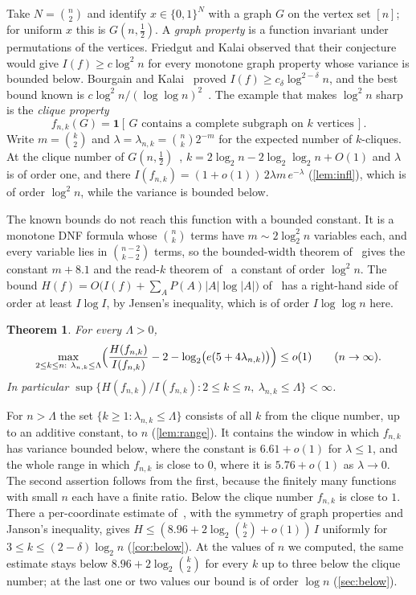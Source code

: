 \documentclass[11pt]{amsart}
\newtheorem{theorem}{Theorem}[section]
\theoremstyle{remark}
\newcommand{\bits}{\{0,1\}}
\begin{document}
Take $N=\binom n2$ and identify $x\in\bits^N$ with a graph $G$ on the vertex set $[n]$; for uniform $x$ this is
$G(n,\frac12)$. A \emph{graph property} is a function invariant under permutations of the vertices. Friedgut and
Kalai observed that their conjecture would give $I(f)\ge c\log^2n$ for every monotone graph property whose variance
is bounded below. Bourgain and Kalai~\cite{BK97} proved $I(f)\ge c_\delta\log^{2-\delta}n$, and the best bound known
is $c\log^2n/(\log\log n)^2$~\cite{KKLMS20}. The example that makes $\log^2n$ sharp is the \emph{clique property}
\[
f_{n,k}(G)=\mathbf 1[\,G\text{ contains a complete subgraph on $k$ vertices}\,].
\]
Write $m=\binom k2$ and $\lambda=\lambda_{n,k}=\binom nk2^{-m}$ for the expected number of $k$-cliques. At the clique
number of $G(n,\frac12)$~\cite{BE76,Mat76}, $k=2\log_2n-2\log_2\log_2n+O(1)$ and $\lambda$ is of order one, and
there $I(f_{n,k})=(1+o(1))\,2\lambda m\,e^{-\lambda}$ (\cref{lem:infl}), which is of order $\log^2n$, while the variance
is bounded below.

The known bounds do not reach this function with a bounded constant. It is a monotone DNF formula whose $\binom nk$
terms have $m\sim2\log_2^2n$ variables each, and every variable lies in $\binom{n-2}{k-2}$ terms, so the
bounded-width theorem of~\cite{Shm26b} gives the constant $m+8.1$ and the read-$k$ theorem of~\cite{Shm26a} a constant
of order $\log^2n$. The bound $H(f)=O\bigl(I(f)+\sum_AP(A)|A|\log|A|\bigr)$ of~\cite{KKLMS20} has a right-hand side
of order at least $I\log I$, by Jensen's inequality, which is of order $I\log\log n$ here.

\begin{theorem}\label{thm:main}
For every $\Lambda>0$,
\[
\max_{2\le k\le n:\ \lambda_{n,k}\le\Lambda}\Bigl(\frac{H(f_{n,k})}{I(f_{n,k})}-2-\log_2\bigl(e(5+4\lambda_{n,k})\bigr)\Bigr)\le o(1)
\qquad(n\to\infty).
\]
In particular $\sup\{H(f_{n,k})/I(f_{n,k}):2\le k\le n,\ \lambda_{n,k}\le\Lambda\}<\infty$.
\end{theorem}

For $n>\Lambda$ the set $\{k\ge1:\lambda_{n,k}\le\Lambda\}$ consists of all $k$ from the clique number, up to an
additive constant, to $n$ (\cref{lem:range}). It contains the window in which $f_{n,k}$ has variance bounded below, where the
constant is $6.61+o(1)$ for $\lambda\le1$, and the whole range in which $f_{n,k}$ is close to $0$, where it is
$5.76+o(1)$ as $\lambda\to0$. The second assertion follows from the first, because the finitely many functions with
small $n$ each have a finite ratio. Below the clique number $f_{n,k}$ is close to $1$. There a per-coordinate
estimate of~\cite{Shm26b}, with the symmetry of graph properties and Janson's inequality, gives
$H\le(8.96+2\log_2\binom k2+o(1))\,I$ uniformly for $3\le k\le(2-\delta)\log_2n$ (\cref{cor:below}). At the values
of $n$ we computed, the same estimate stays below $8.96+2\log_2\binom k2$ for every $k$ up to three below the clique
number; at the last one or two values our bound is of order $\log n$ (\cref{sec:below}).
\end{document}

